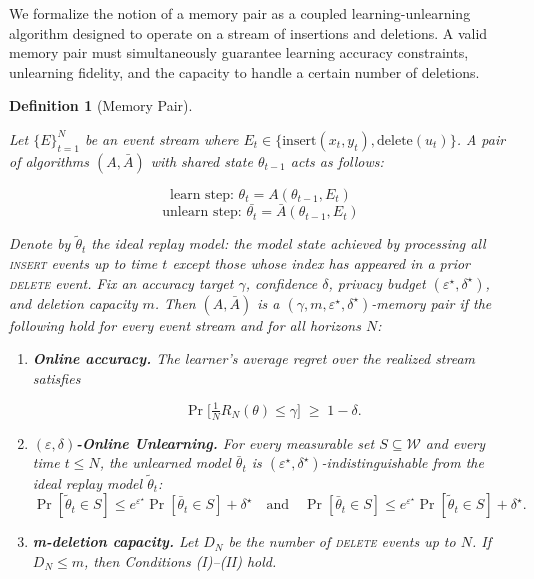 \documentclass[a4paper,12pt]{article}
\newtheorem{definition}{Definition}
\begin{document}
We formalize the notion of a memory pair as a coupled learning-unlearning algorithm designed to operate on a stream of insertions and deletions. A valid memory pair must simultaneously guarantee learning accuracy constraints, unlearning fidelity, and the capacity to handle a certain number of deletions.

\begin{definition}[Memory Pair]
\label{def:memory-pair}

Let $\{E\}_{t=1}^{N}$ be an event stream where $E_{t} \in \{\text{insert}(x_{t},y_{t}), \text{delete}(u_{t})\}$. A pair of algorithms $(A, \bar{A})$ with shared state $\theta_{t-1}$ acts as follows:

$$
\text{learn step: }\theta_t = A(\theta_{t-1},E_t) 
$$
$$
\text{unlearn step: } \bar{\theta_{t}} = \bar{A}(\theta_{t-1},E_{t})
$$

Denote by $\tilde\theta_{t}$ the ideal replay model: the model state achieved by processing all \textsc{insert} events up to time $t$ except those whose index has appeared in a prior \textsc{delete} event. Fix an accuracy target $\gamma$, confidence $\delta$, privacy budget $(\varepsilon^\star,\delta^\star)$, and deletion capacity $m$. Then $(A,\bar A)$ is a \emph{$(\gamma,m,\varepsilon^\star,\delta^\star)$-memory pair} if the following hold for every event stream and for all horizons $N$:

\begin{enumerate}
\item \textbf{Online accuracy.} The learner’s average regret over the realized stream satisfies

\[
\Pr\!\bigl[\tfrac{1}{N} R_N(\theta)\le\gamma\bigr] \;\ge\; 1-\delta.
\]

\item \textbf{$(\varepsilon,\delta)$-Online Unlearning.} For every measurable set $S\subseteq\mathcal W$ and every time $t\!\le\!N$, the unlearned model $\bar\theta_{t}$ is $(\varepsilon^{\star},\delta^{\star})$-indistinguishable from the ideal replay model $\tilde\theta_{t}$:
\[
    \Pr[\tilde\theta_t\in S] \le e^{\varepsilon^\star}\Pr[\bar\theta_t\in S]+\delta^\star \quad \text{and} \quad \Pr[\bar\theta_t\in S] \le e^{\varepsilon^\star}\Pr[\tilde\theta_t\in S]+\delta^\star.
\]

\item \textbf{m-deletion capacity.} Let $D_N$ be the number of \textsc{delete} events up to $N$. If $D_N\le m$, then Conditions (I)–(II) hold.

\end{enumerate}
\end{definition}
\end{document}
